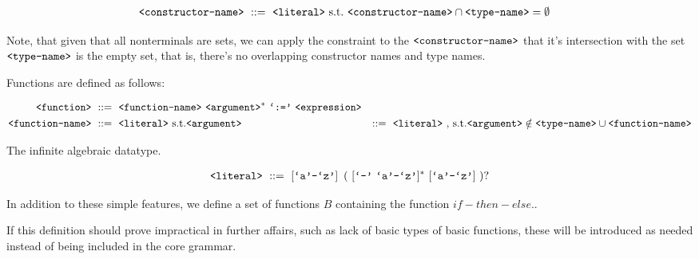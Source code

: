 \begin{align}
\text{{\ttfamily<constructor-name>}}\ &::=\ \text{{\ttfamily<literal>}}\ \text{s.t.}
\ \text{{\ttfamily<constructor-name>}}\cap \text{{\ttfamily<type-name>}} = \emptyset
\end{align}

Note, that given that all nonterminals are sets, we can apply the constraint to
the $\text{{\ttfamily<constructor-name>}}$ that it's intersection with the set
$\text{{\ttfamily<type-name>}}$ is the empty set, that is, there's no overlapping
constructor names and type names.


Functions are defined as follows:

\begin{align}
\text{{\ttfamily<function>}}\ &::=\ \text{{\ttfamily<function-name>}}
\ \text{{\ttfamily<argument>}}^*\ \text{{\ttfamily`:='}}\ \text{{\ttfamily<expression>}}\\
\text{{\ttfamily<function-name>}}\ &::=\ \text{{\ttfamily<literal>}}\ \text{s.t.} 
\text{{\ttfamily<argument>}}\ &::=\ \text{{\ttfamily<literal>}}\ \text{, s.t.}
\text{{\ttfamily<argument>}}\notin\text{{\ttfamily<type-name>}}\cup\text{{\ttfamily<function-name>}}
\end{align}

The infinite algebraic datatype.

\begin{align}
\text{{\ttfamily<literal>}}\ &::=\ [\text{{\ttfamily`a'}}\text{{\ttfamily-}}\text{{\ttfamily`z'}}]
\ \left (\ [\text{{\ttfamily`-'}}\ \text{{\ttfamily`a'}}\text{{\ttfamily-}}\text{{\ttfamily`z'}}]^*
\ [\text{{\ttfamily`a'}}\text{{\ttfamily-}}\text{{\ttfamily`z'}}]\ \right )?\\
\end{align}


In addition to these simple features, we define a set of functions $B$
containing the function $if-then-else$..

If this definition should prove impractical in further affairs, such as lack of
basic types of basic functions, these will be introduced as needed instead of
being included in the core grammar.
